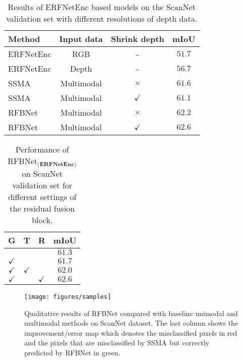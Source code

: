 \documentclass[letterpaper, 10 pt, conference]{ieeeconf}
\begin{document}
	\begin{table}[t]
		\footnotesize 
		\centering
		\caption{Results of ERFNetEnc based models on the ScanNet validation set with different resolutions of depth data.}
		\label{tab_scannet_erfnetenc_val_depth}
		\begin{threeparttable}
			\begin{tabular}{l c c c}
				\toprule
				Method & Input data & Shrink depth & mIoU \\
				\midrule
				ERFNetEnc 		& RGB 		& - & $51.7$	\\
				ERFNetEnc 		& Depth 	& - & $56.7$	\\
				SSMA 	& Multimodal		& $\times$ & $61.6$	\\
				SSMA 	& Multimodal 	& $\checkmark$ & $61.1$ 	\\
				RFBNet 	& Multimodal& $\times$ & $62.2$ 	\\
				RFBNet 	& Multimodal& $\checkmark$ & $\mathbf{62.6}$  \\
				\bottomrule
			\end{tabular}
		\end{threeparttable}
	\end{table}
	\begin{table}[!t]
		\footnotesize
		\caption{Performance of RFBNet$_{\textbf{(ERFNetEnc)}}$ on ScanNet validation set for different settings of the residual fusion block.}
		\label{tab_scannet_erfnetenc_val_rfb}
		\centering
\begin{threeparttable}
			\begin{tabular}{c c c c}
				\toprule
				G & T & R & mIoU \\
				\midrule
				&			 &			& $61.3$	\\
				$\checkmark$&  			 &			& $61.7$	\\
				$\checkmark$&$\checkmark$&			& $62.0$	\\
				$\checkmark$&			 &$\checkmark$& $\mathbf{62.6}$	\\
				\bottomrule
			\end{tabular}
\end{threeparttable}
	\end{table}
	
	
	\begin{figure*}[!htbp]
		\centering
		\texttt{[image: figures/samples]}
		\caption{Qualitative results of RFBNet compared with baseline unimodal and multimodal methods on ScanNet dataset. The last column shows the improvement/error map which denotes the misclassified pixels in red and the pixels that are misclassified by SSMA but correctly predicted by RFBNet in green.}
		\label{fig_samples}
	\end{figure*}
	
\end{document}
